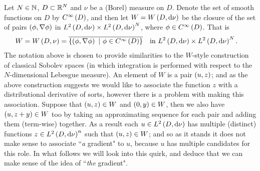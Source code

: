 Let $N\in\mathbb{N}$, $D\subset\mathbb{R}^N$ and $\nu$ be a (Borel) measure on $D$.
Denote the set of smooth functions on $D$ by $C^{\infty}\left( D \right)$, and then let $W=W\left( D,\mathrm{d}\nu \right)$ be the closure of the set of pairs $\left( \phi,\nabla\phi \right)$ in $L^{2}\left( D,\mathrm{d}\nu \right)\times L^{2}\left( D,\mathrm{d}\nu \right)^N$, where $\phi\in C^{\infty}\left( D \right)$.
That is
\begin{align} \label{eq:WSetDefinition}
	W = W\bracs{D,\nu} &= \overline{\clbracs{\bracs{\phi,\grad\phi} \ \vert \ \phi\in\smooth{D}}} \quad \text{in} \ \ltwo{D}{\nu}\times\ltwo{D}{\nu}^N.
\end{align}
The notation above is chosen to provide similarities to the $W$-style construction of classical Sobolev spaces (in which integration is performed with respect to the $N$-dimensional Lebesgue measure).
An element of $W$ is a pair $\left( u,z \right)$; and as the above construction suggests we would like to associate the function $z$ with a distributional derivative of sorts, however there is a problem with making this association.
Suppose that $\left( u,z \right)\in W$ and $\left( 0,y \right)\in W$, then we also have $\left( u,z+y \right)\in W$ too by taking an approximating sequence for each pair and adding them (term-wise) together.
As a result each $u\in L^{2}\left( D,\mathrm{d}\nu \right)$ has multiple (distinct) functions $z\in L^{2}\left( D,\mathrm{d}\nu \right)^n$ such that $\left( u,z \right)\in W$; and so as it stands it does not make sense to associate ``\textit{a} gradient" to $u$, because $u$ has multiple candidates for this role.
In what follows we will look into this quirk, and deduce that we can make sense of the idea of ``\textit{the} gradient". \newline

